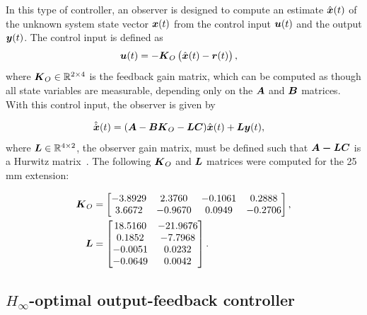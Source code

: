 In this type of controller, an observer is designed to compute an estimate  $\hat{\boldsymbol{x}}(t)$ of the unknown system state vector $\boldsymbol{x}(t)$ from the control input $\boldsymbol{u}(t)$ and the output $\boldsymbol{y}(t)$. The control input is defined as 
\begin{align}
&\boldsymbol{u}(t)=-\boldsymbol{K}_O\left(\hat{\boldsymbol{x}}(t)-\boldsymbol{r}(t)\right), \label{eq:obs-ctl-law}
\end{align}
where $\boldsymbol{K}_O \in \mathbb{R}^{2\times4}$ is the feedback gain matrix, which can be computed as though all state variables are measurable, depending only on the $\boldsymbol{A}$ and $\boldsymbol{B}$ matrices. With this control input, the observer is given by 

\begin{align}
&\hat{\dot{\boldsymbol{x}}}(t)=(\boldsymbol{A}-\boldsymbol{B}\boldsymbol{K}_O-\boldsymbol{LC})\hat{\boldsymbol{x}}(t)+\boldsymbol{L}\boldsymbol{y}(t), \label{eq:obs-estimate}
\end{align}
where $\boldsymbol{L}\in \mathbb{R}^{4\times2}$, the observer gain matrix, must be defined such that $\boldsymbol{A-LC}$ is a Hurwitz matrix~\cite{Aastrom2010}.
The following $\boldsymbol{K}_O$ and $\boldsymbol{L}$ matrices were computed for the 25\,mm extension: 

\begin{align*}
\boldsymbol{K}_O &=\begin{bmatrix}  
            -3.8929  & 2.3760   &  -0.1061  &  0.2888\\
             3.6672  & -0.9670  &   0.0949  & -0.2706
    \end{bmatrix},\\
\boldsymbol{L} &=\begin{bmatrix}
           18.5160 &  -21.9676\\   
            0.1852 &  -7.7968\\
           -0.0051 &   0.0232\\
           -0.0649 &   0.0042\\
    \end{bmatrix}.
\end{align*}

\subsection{$H_\infty$-optimal output-feedback controller}

